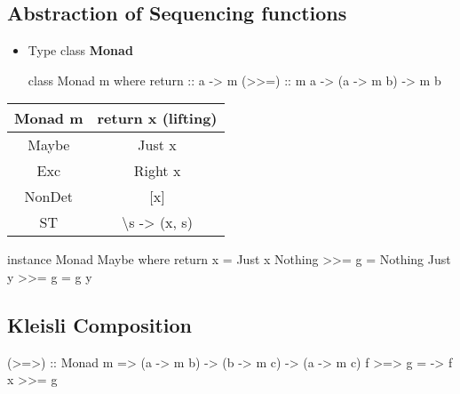 \begin{itemize}
\section*{Abstraction of Sequencing functions}


\begin{itemize}
    \item Type class \textbf{Monad}
\begin{codebox}[haskell]
class Monad m where
    return :: a -> m 
    (>>=) :: m a -> (a -> m b) -> m b
\end{codebox}
\end{itemize}

\vspace{9pt}\begin{center}\begin{tabular}{|c|c|}\hline
\rowcolor{grau} Monad m             & return x (lifting)    \\\hline
                Maybe               & Just x                \\\hline
                Exc                 & Right x               \\\hline
                NonDet              & [x]                   \\\hline
                ST                  & \textbackslash s -> (x, s)          \\\hline
\end{tabular}\end{center}\vspace{9pt}

\begin{codebox}[haskell]
instance Monad Maybe where
    return x = Just x
    Nothing >>= g = Nothing
    Just y  >>= g = g y
\end{codebox}

\subsection*{Kleisli Composition}
\begin{codebox}[haskell]
(>=>) :: Monad m => (a -> m b) -> (b -> m c) -> (a -> m c)
f >=> g = \x -> f x >>= g
\end{codebox}






\end{itemize}







